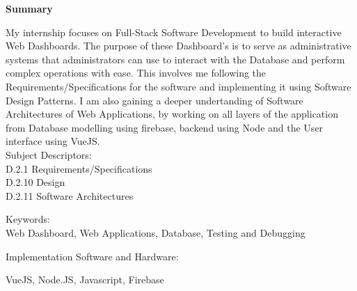\begin{center}
	\Large\textbf{Summary}
\end{center}
\noindent
My internship focuses on Full-Stack Software Development to build interactive Web Dashboards.
The purpose of these Dashboard's is to serve as administrative systems that administrators can use to interact
with the Database and perform complex operations with ease.
This involves me following the Requirements/Specifications for the software and implementing it using Software Design Patterns.
I am also gaining a deeper undertanding of Software Architectures of Web Applications, by working on all layers of the application from
Database modelling using firebase, backend using Node and the User interface using VueJS.
\\

\noindent
Subject Descriptors:\\
\indent D.2.1  Requirements/Specifications\\
\indent D.2.10 Design\\
\indent D.2.11 Software Architectures

\noindent
Keywords:\\
\indent Web Dashboard, Web Applications, Database, Testing and Debugging

\noindent
Implementation Software and Hardware:

\indent VueJS, Node.JS, Javascript, Firebase